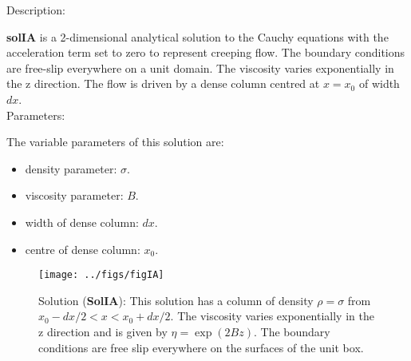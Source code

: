   {\large \fontB Description:}
  
  {\bf solIA} is a 2-dimensional analytical solution to the Cauchy equations with the acceleration term set to zero
  to represent creeping flow. The boundary conditions are free-slip everywhere on a unit domain.  The viscosity varies exponentially in the z direction.
  The flow is driven by a dense column centred at $ x=x_0 $ of width $dx$.
  \\

 {\large \fontB Parameters:}
  
 The variable parameters of this solution are:
 \begin{itemize}
   \item{density parameter: $ \sigma $.}
   \item{viscosity parameter: $B$.}
   \item{width of dense column: $dx$.}
   \item{centre of dense column: $x_0$.}

 \end{itemize}

  \begin{SCfigure}[][h]
    \texttt{[image: ../figs/figIA]}
    \caption[Short caption]{\label{figIA} 
      Solution ({\bf SolIA}):
      This solution has a column of density $\rho = \sigma$ from $x_0-dx/2 < x < x_0+dx/2$.
      The viscosity varies exponentially in the z direction and is given by
      $\eta = \exp (2 B z)$.
      The boundary conditions are free slip everywhere on the surfaces of the unit box.}
  \end{SCfigure} 
  

